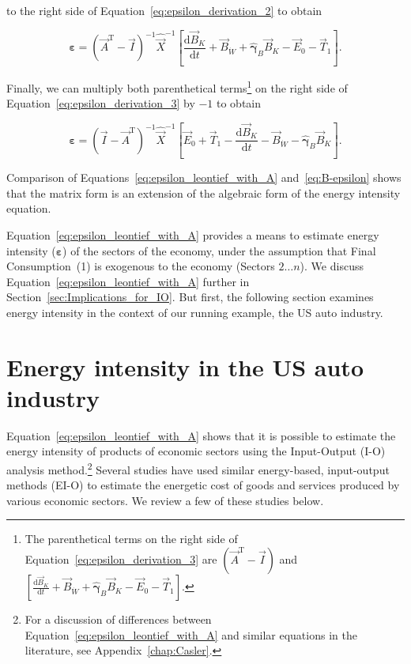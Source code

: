 \noindent{}to the right side of Equation~\ref{eq:epsilon_derivation_2} to obtain

\begin{equation} \label{eq:epsilon_derivation_3}
	\boldsymbol{\varepsilon}
	= {(\vec{A}^{\mathrm{T}} - \vec{I})}^{-1} {\hat{\vec{X}}}^{-1} 
		\left[
			\frac{\mathrm{d}\vec{B}_{K}}{\mathrm{d}t}
			+ \vec{B}_{\dot{W}}
			+ \hat{\boldsymbol{\gamma}}_{B} \vec{B}_{K}
			- \vec{E}_{0}
			- \vec{T}_{1} 
		\right].
\end{equation}

\noindent{}Finally, we can multiply both parenthetical terms\footnote{The parenthetical
terms on the right side of Equation~\ref{eq:epsilon_derivation_3} 
are $(\vec{A}^{\mathrm{T}} - \vec{I})$ and
$
\left[
	\frac{\mathrm{d}\vec{B}_{K}}{\mathrm{d}t}
	+ \vec{B}_{\dot{W}}
	+ \hat{\boldsymbol{\gamma}}_{B} \vec{B}_{K}
	- \vec{E}_{0}
	- \vec{T}_{1} 
\right]
$.} 
on the right side of Equation~\ref{eq:epsilon_derivation_3} by $-1$ to obtain

\begin{equation} \label{eq:epsilon_leontief_with_A}
	\boldsymbol{\varepsilon} 
	= {(\vec{I} - \vec{A}^{\mathrm{T}})}^{-1}\hat{\vec{X}}^{-1}
		\left[\vec{E}_{0} 
				+ \vec{T}_{1} 
				- \frac{\mathrm{d}\vec{B}_{K}}{\mathrm{d}t} 
				- \vec{B}_{\dot{W}}
				- \hat{\boldsymbol{\gamma}}_{B}\vec{B}_{K}
		\right].
\end{equation}

\noindent{}Comparison of Equations~\ref{eq:epsilon_leontief_with_A}
and~\ref{eq:B-epsilon} shows that 
the matrix form is an extension of the algebraic form of the energy intensity equation.

Equation~\ref{eq:epsilon_leontief_with_A} provides a means 
to estimate energy intensity ($\boldsymbol{\varepsilon}$)
of the sectors of the economy, under the assumption that
Final Consumption~(1) is exogenous to the economy (Sectors $2\ldots{}n$). 
We discuss Equation~\ref{eq:epsilon_leontief_with_A}
further in Section~\ref{sec:Implications_for_IO}.
But first, the following section examines energy intensity 
in the context of our running example, the US auto industry.


\section{Energy intensity in the US auto industry}
\label{sec:intensity_auto}

Equation~\ref{eq:epsilon_leontief_with_A} shows 
that it is possible to estimate the energy intensity 
of products of economic sectors 
using the Input-Output (I-O) analysis method.\footnote{For a discussion
	of differences between Equation~\ref{eq:epsilon_leontief_with_A} 
	and similar equations in the literature, 
	see Appendix~\ref{chap:Casler}.}
Several studies have used similar energy-based, 
input-output methods (EI-O) to estimate the energetic
cost of goods and services produced by various
economic sectors.\cite{Bullard1975, Costanza:1980ww, Costanza:1984tq, EIOLCA2014, Hendrickson2006,
Herendeen1973, Herendeen1974, Herendeen1974a, Herendeen1978,
Wright1974, Lenzen1998, Machado2001}
We review a few of these studies below.


